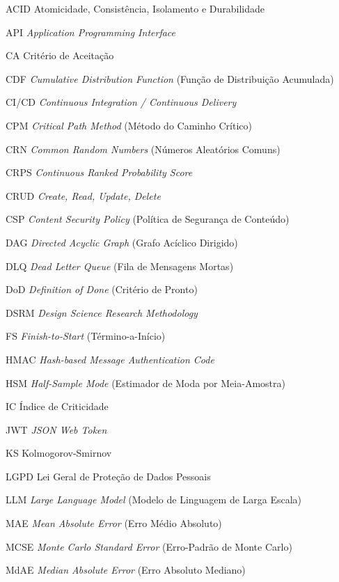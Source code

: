 \documentclass[12pt,openany,oneside,a4paper,english,brazilian,sumario=tradicional]{abntex2}
\begin{document}
\begin{siglas}
  \item[ACID] Atomicidade, Consistência, Isolamento e Durabilidade
  \item[API] \textit{Application Programming Interface}
  \item[CA] Critério de Aceitação
  \item[CDF] \textit{Cumulative Distribution Function} (Função de Distribuição Acumulada)
  \item[CI/CD] \textit{Continuous Integration / Continuous Delivery}
  \item[CPM] \textit{Critical Path Method} (Método do Caminho Crítico)
  \item[CRN] \textit{Common Random Numbers} (Números Aleatórios Comuns)
  \item[CRPS] \textit{Continuous Ranked Probability Score}
  \item[CRUD] \textit{Create, Read, Update, Delete}
  \item[CSP] \textit{Content Security Policy} (Política de Segurança de Conteúdo)
  \item[DAG] \textit{Directed Acyclic Graph} (Grafo Acíclico Dirigido)
  \item[DLQ] \textit{Dead Letter Queue} (Fila de Mensagens Mortas)
  \item[DoD] \textit{Definition of Done} (Critério de Pronto)
  \item[DSRM] \textit{Design Science Research Methodology}
  \item[FS] \textit{Finish-to-Start} (Término-a-Início)
  \item[HMAC] \textit{Hash-based Message Authentication Code}
  \item[HSM] \textit{Half-Sample Mode} (Estimador de Moda por Meia-Amostra)
  \item[IC] Índice de Criticidade
  \item[JWT] \textit{JSON Web Token}
  \item[KS] Kolmogorov-Smirnov
  \item[LGPD] Lei Geral de Proteção de Dados Pessoais
  \item[LLM] \textit{Large Language Model} (Modelo de Linguagem de Larga Escala)
  \item[MAE] \textit{Mean Absolute Error} (Erro Médio Absoluto)
  \item[MCSE] \textit{Monte Carlo Standard Error} (Erro-Padrão de Monte Carlo)
  \item[MdAE] \textit{Median Absolute Error} (Erro Absoluto Mediano)

\end{siglas}
\end{document}
